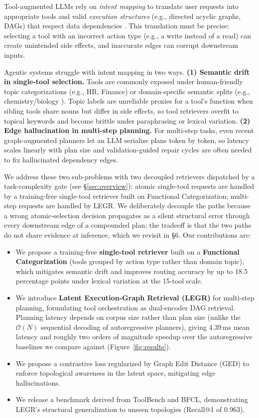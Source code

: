 \documentclass{article}
\begin{document}
Tool-augmented LLMs rely on \emph{intent mapping} to translate user requests into appropriate tools and valid \emph{execution structures} (e.g., directed acyclic graphs, DAGs) that respect data dependencies \cite{mialon2023augmented,shen2023hugginggpt,song2023restgpt}. This translation must be precise: selecting a tool with an incorrect action type (e.g., a write instead of a read) can create unintended side effects, and inaccurate edges can corrupt downstream inputs.

Agentic systems struggle with intent mapping in two ways. \textbf{(1) Semantic drift in single-tool selection.} Tools are commonly exposed under human-friendly topic categorizations (e.g., HR, Finance) or domain-specific semantic splits (e.g., chemistry/biology \cite{ding2025scitoolagent}). Topic labels are unreliable proxies for a tool's function when sibling tools share nouns but differ in side effects, so tool retrievers overfit to topical keywords and become brittle under paraphrasing or lexical variation. \textbf{(2) Edge hallucination in multi-step planning.} For multi-step tasks, even recent graph-augmented planners \cite{chen2026gtool,xiu2026optgraph} let an LLM serialize plans token by token, so latency scales linearly with plan size and validation-guided repair cycles are often needed to fix hallucinated dependency edges.

We address these two sub-problems with two decoupled retrievers dispatched by a task-complexity gate (see \S\ref{sec:overview}): atomic single-tool requests are handled by a training-free single-tool retriever built on Functional Categorization; multi-step requests are handled by LEGR. We deliberately decouple the paths because a wrong atomic-selection decision propagates as a silent structural error through every downstream edge of a compounded plan; the tradeoff is that the two paths do not share evidence at inference, which we revisit in \S6. Our contributions are:
\begin{itemize}
    \item We propose a training-free \textbf{single-tool retriever} built on a \textbf{Functional Categorization} (tools grouped by action type rather than domain topic), which mitigates semantic drift and improves routing accuracy by up to 18.5 percentage points under lexical variation at the 15-tool scale.
    \item We introduce \textbf{Latent Execution-Graph Retrieval (LEGR)} for multi-step planning, formulating tool orchestration as dual-encoder DAG retrieval. Planning latency depends on corpus size rather than plan size (unlike the $\mathcal{O}(N)$ sequential decoding of autoregressive planners), giving 4.39\,ms mean latency and roughly two orders of magnitude speedup over the autoregressive baselines we compare against (Figure~\ref{fig:results}).
    \item We propose a contrastive loss regularized by Graph Edit Distance (GED) to enforce topological awareness in the latent space, mitigating edge hallucinations.
    \item We release a benchmark derived from ToolBench and BFCL, demonstrating LEGR's structural generalization to unseen topologies (Recall@1 of 0.963).
\end{itemize}
\end{document}

